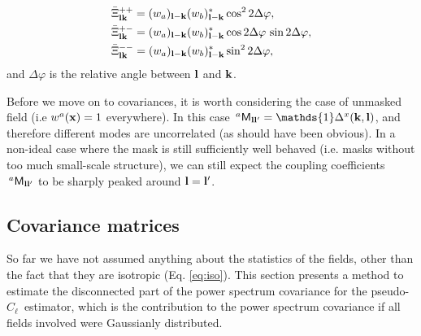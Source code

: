 \documentclass[a4paper,11pt]{article}
\newcommand{\PCL}{pseudo-$C_\ell$~}
\begin{document}
\begin{itemize}
\begin{align}
        &\bar{\Xi}^{++}_{{\bf l}{\bf k}}=(w_a)_{{\bf l}-{\bf k}}(w_b)^*_{{\bf l}-{\bf k}}\cos^22\Delta\varphi,\\
        &\bar{\Xi}^{+-}_{{\bf l}{\bf k}}=(w_a)_{{\bf l}-{\bf k}}(w_b)^*_{{\bf l}-{\bf k}}\cos2\Delta\varphi\,\sin2\Delta\varphi,\\
        &\bar{\Xi}^{--}_{{\bf l}{\bf k}}=(w_a)_{{\bf l}-{\bf k}}(w_b)^*_{{\bf l}-{\bf k}}\sin^22\Delta\varphi,\\
      \end{align}
      and $\Delta\varphi$ is the relative angle between ${\bf l}$ and ${\bf k}$.
    \end{itemize}

    Before we move on to covariances, it is worth considering the case of unmasked field (i.e $w^a({\bf x})=1$ everywhere). In this case $\,^a{\sf M}_{{\bf l}{\bf l}'}=\mathds{1}\Delta^x({\bf k},{\bf l})$, and therefore different modes are uncorrelated (as should have been obvious). In a non-ideal case where the mask is still sufficiently well behaved (i.e. masks without too much small-scale structure), we can still expect the coupling coefficients $\,^a{\sf M}_{{\bf l}{\bf l}'}$ to be sharply peaked around ${\bf l}={\bf l}'$.
  
  \subsection{Covariance matrices}\label{ssec:theory.pclcov}
    So far we have not assumed anything about the statistics of the fields, other than the fact that they are isotropic (Eq. \ref{eq:iso}). This section presents a method to estimate the disconnected part of the power spectrum covariance for the \PCL estimator, which is the contribution to the power spectrum covariance if all fields involved were Gaussianly distributed.
    
\end{document}
